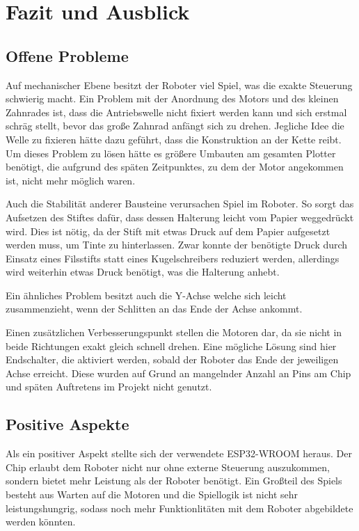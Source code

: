 \documentclass[conference,compsoc,final,a4paper]{IEEEtran}
\begin{document}
\section{Fazit und Ausblick}

\subsection{Offene Probleme}

Auf mechanischer Ebene besitzt der Roboter viel Spiel, was die exakte Steuerung schwierig macht. Ein Problem mit der Anordnung
des Motors und des kleinen Zahnrades ist, dass die
Antriebswelle nicht fixiert werden kann und sich erstmal schräg stellt, bevor das große Zahnrad anfängt sich zu drehen. Jegliche
Idee die Welle zu fixieren hätte dazu geführt, dass die Konstruktion an der Kette reibt. Um dieses Problem zu lösen hätte es größere
Umbauten am gesamten Plotter benötigt, die aufgrund des späten Zeitpunktes, zu dem der Motor angekommen ist, nicht mehr möglich waren.

Auch die Stabilität anderer Bausteine verursachen Spiel im Roboter. So sorgt das Aufsetzen des Stiftes dafür, dass dessen Halterung
leicht vom Papier weggedrückt wird. Dies ist nötig, da der Stift mit etwas Druck auf dem Papier aufgesetzt werden muss, um
Tinte zu hinterlassen. Zwar konnte der benötigte Druck durch Einsatz eines Filsstifts statt eines Kugelschreibers reduziert werden,
allerdings wird weiterhin etwas Druck benötigt, was die Halterung anhebt.

Ein ähnliches Problem besitzt auch die Y-Achse welche sich leicht zusammenzieht, wenn der Schlitten an das Ende der Achse ankommt.

Einen zusätzlichen Verbesserungspunkt stellen die Motoren dar, da sie nicht in beide Richtungen exakt gleich schnell drehen. Eine
mögliche Lösung sind hier Endschalter, die aktiviert werden, sobald der Roboter das Ende der jeweiligen Achse erreicht. Diese wurden
auf Grund an mangelnder Anzahl an Pins am Chip und späten Auftretens im Projekt nicht genutzt.

\subsection{Positive Aspekte}

Als ein positiver Aspekt stellte sich der verwendete ESP32-WROOM heraus. Der Chip erlaubt dem Roboter nicht nur ohne externe Steuerung
auszukommen, sondern bietet mehr Leistung als der Roboter benötigt. Ein Großteil des Spiels besteht aus Warten auf die Motoren und die
Spiellogik ist nicht sehr leistungshungrig, sodass noch mehr Funktionlitäten mit dem Roboter abgebildete werden könnten.
\end{document}
